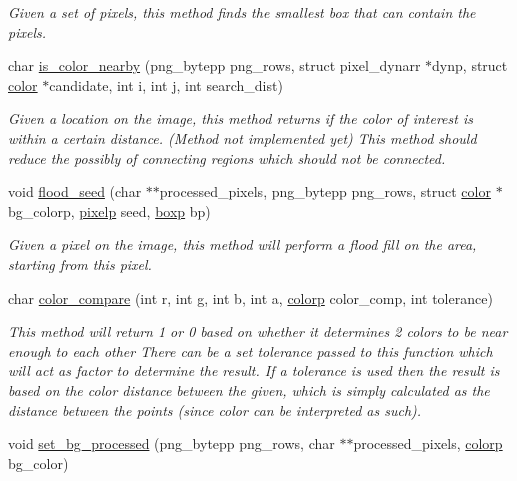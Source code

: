 \begin{DoxyCompactItemize}
\begin{DoxyCompactList}\small\item\em Given a set of pixels, this method finds the smallest box that can contain the pixels. \item\end{DoxyCompactList}\item 
char \hyperlink{group__funcs_ga84198660774aad2a3bc31e2c6ad0d660}{is\_\-color\_\-nearby} (png\_\-bytepp png\_\-rows, struct pixel\_\-dynarr $\ast$dynp, struct \hyperlink{structcolor}{color} $\ast$candidate, int i, int j, int search\_\-dist)
\begin{DoxyCompactList}\small\item\em Given a location on the image, this method returns if the color of interest is within a certain distance. (Method not implemented yet) This method should reduce the possibly of connecting regions which should not be connected. \item\end{DoxyCompactList}\item 
void \hyperlink{group__funcs_ga27b38761dc5921b25d17babc675e252c}{flood\_\-seed} (char $\ast$$\ast$processed\_\-pixels, png\_\-bytepp png\_\-rows, struct \hyperlink{structcolor}{color} $\ast$bg\_\-colorp, \hyperlink{structpixel}{pixelp} seed, \hyperlink{structbox}{boxp} bp)
\begin{DoxyCompactList}\small\item\em Given a pixel on the image, this method will perform a flood fill on the area, starting from this pixel. \item\end{DoxyCompactList}\item 
char \hyperlink{group__funcs_gac569d4277e2155916296ebaad7e03e42}{color\_\-compare} (int r, int g, int b, int a, \hyperlink{structcolor}{colorp} color\_\-comp, int tolerance)
\begin{DoxyCompactList}\small\item\em This method will return 1 or 0 based on whether it determines 2 colors to be near enough to each other There can be a set tolerance passed to this function which will act as factor to determine the result. If a tolerance is used then the result is based on the color distance between the given, which is simply calculated as the distance between the points (since color can be interpreted as such). \item\end{DoxyCompactList}\item 
void \hyperlink{group__funcs_gaad3bdb6543a1c97e6b56c2330c07d5c8}{set\_\-bg\_\-processed} (png\_\-bytepp png\_\-rows, char $\ast$$\ast$processed\_\-pixels, \hyperlink{structcolor}{colorp} bg\_\-color)

\end{DoxyCompactItemize}
